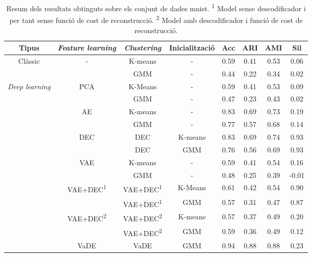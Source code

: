 \documentclass[CAT,BIB]{TFUOC}%
\begin{document}
        \begin{table}[p]
            \small
            \centering
            \begin{minipage}{\textwidth}

            \begin{tabular}{@{}cccccccc@{}}
                \toprule
                \textbf{Tipus} & \textbf{\textit{Feature learning}} & \textbf{\textit{Clustering}} & \textbf{Inicialització} & \textbf{Acc} & \textbf{ARI} & \textbf{AMI} & \textbf{Sil} \\ \midrule
                \multirow{2}{*}{Clàssic} & \multirow{2}{*}{-} & K-means & - & 0.59 & 0.41 & 0.53 & 0.06 \\
                &  & GMM & - & 0.44 & 0.22 & 0.34 & 0.02 \\
                \multirow{13}{*}{\textit{Deep learning}} & \multirow{2}{*}{PCA} & K-Means & - & 0.59 & 0.41 & 0.53 & 0.09 \\
                &  & GMM & - & 0.47 & 0.23 & 0.43 & 0.02 \\  \midrule
                & \multirow{2}{*}{AE} & K-means & - & 0.83 & 0.69 & 0.73 & 0.19 \\
                &  & GMM & - & 0.77 & 0.57 & 0.68 & 0.14 \\
                & \multirow{2}{*}{DEC} & DEC & K-means & 0.83 & 0.69 & 0.74 & 0.93 \\
                &  & DEC & GMM & 0.76 & 0.56 & 0.69 & 0.93 \\
                & \multirow{2}{*}{VAE} & K-means & - & 0.59 & 0.41 & 0.54 & 0.16 \\
                &  & GMM & - & 0.48 & 0.25 & 0.39 & -0.01 \\
                & \multirow{2}{*}{VAE+DEC\textsuperscript{1}} & VAE+DEC\textsuperscript{1} & K-Means & 0.61 & 0.42 & 0.54 & 0.90 \\
                &  & VAE+DEC\textsuperscript{1} & GMM & 0.57 & 0.31 & 0.47 & 0.87 \\
                & \multirow{2}{*}{VAE+DEC\textsuperscript{2}} & VAE+DEC\textsuperscript{2} & K-means & 0.57 & 0.37 & 0.49 & 0.20 \\
                &  & VAE+DEC\textsuperscript{2} & GMM & 0.59 & 0.36 & 0.49 & 0.12 \\
                & VaDE & VaDE & GMM & 0.94 & 0.88 & 0.88 & 0.23 \\ \bottomrule
            \end{tabular}
            \caption[MNIST: resultats]{Resum dels resultats obtinguts sobre els conjunt de dades \gls{mnist}.
                \newline \textsuperscript{1} Model sense descodificador i per tant sense funció de cost de reconstrucció.
                \newline \textsuperscript{2} Model amb descodificador i funció de cost de reconstrucció.
            }
            \label{t:results_mnist}
            \end{minipage}
        \end{table}
\end{document}
